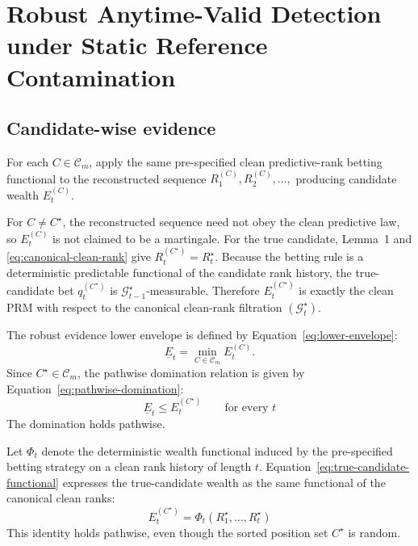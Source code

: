\section{Robust Anytime-Valid Detection under Static Reference Contamination}

\subsection{Candidate-wise evidence}

For each \(C\in\mathcal C_m\), apply the same pre-specified clean predictive-rank betting functional to the reconstructed sequence
\(R_1^{(C)},R_2^{(C)},\ldots,\)
producing candidate wealth \(E_t^{(C)}\).

For \(C\neq C^\star\), the reconstructed sequence need not obey the clean predictive law, so \(E_t^{(C)}\) is not claimed to be a martingale. For the true candidate, Lemma~1 and \eqref{eq:canonical-clean-rank} give
\(R_t^{(C^\star)}=R_t^\star.\)
Because the betting rule is a deterministic predictable functional of the candidate rank history, the true-candidate bet \(q_t^{(C^\star)}\) is \(\mathcal G_{t-1}^\star\)-measurable. Therefore \(E_t^{(C^\star)}\) is exactly the clean PRM with respect to the canonical clean-rank filtration \((\mathcal G_t^\star)\).

The robust evidence lower envelope is defined by Equation~\eqref{eq:lower-envelope}:
\begin{equation}
  \underline E_t
  =
  \min_{C\in\mathcal C_m}E_t^{(C)}.
  \label{eq:lower-envelope}
\end{equation}
Since \(C^\star\in\mathcal C_m\), the pathwise domination relation is given by Equation~\eqref{eq:pathwise-domination}:
\begin{equation}
  \underline E_t
  \le
  E_t^{(C^\star)}
  \qquad\text{for every }t
  \label{eq:pathwise-domination}
\end{equation}
The domination holds pathwise.

\begin{lemma}
Let \(\Phi_t\) denote the deterministic wealth functional induced by the pre-specified betting strategy on a clean rank history of length \(t\). Equation~\eqref{eq:true-candidate-functional} expresses the true-candidate wealth as the same functional of the canonical clean ranks:
\begin{equation}
E_t^{(C^\star)}
  =
  \Phi_t(R_1^\star,\ldots,R_t^\star)
  \label{eq:true-candidate-functional}
\end{equation}
This identity holds pathwise, even though the sorted position set \(C^\star\) is random.
\end{lemma}

